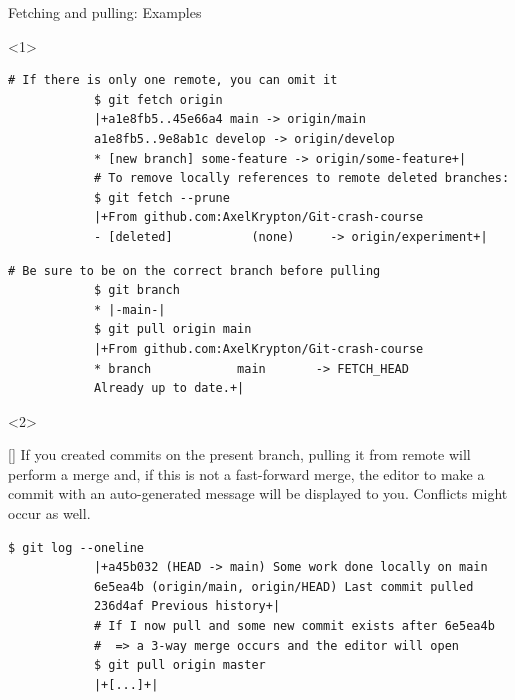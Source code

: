 \documentclass[usenames,svgnames,14pt]{beamer}
\begin{document}
\begin{frame}[fragile]{Fetching and pulling: Examples}
    \begin{onlyenv}<1>
        \begin{lstlisting}[style=MyBash]
            # If there is only one remote, you can omit it
            $ git fetch origin
            |+a1e8fb5..45e66a4 main -> origin/main
            a1e8fb5..9e8ab1c develop -> origin/develop
            * [new branch] some-feature -> origin/some-feature+|
            # To remove locally references to remote deleted branches:
            $ git fetch --prune
            |+From github.com:AxelKrypton/Git-crash-course
            - [deleted]           (none)     -> origin/experiment+|
        \end{lstlisting}
        \begin{lstlisting}[style=MyBash]
            # Be sure to be on the correct branch before pulling
            $ git branch
            * |-main-|
            $ git pull origin main
            |+From github.com:AxelKrypton/Git-crash-course
            * branch            main       -> FETCH_HEAD
            Already up to date.+|
        \end{lstlisting}
    \end{onlyenv}
    \begin{onlyenv}<2>
        \begin{varblock}{}[\textwidth]{}
            If you created commits on the present branch, pulling it from remote will perform a merge and, if this is not a fast-forward merge, the editor to make a commit with an auto-generated message will be displayed to you. \alert{Conflicts might occur as well.}
        \end{varblock}
        \begin{lstlisting}[style=MyBash]
            $ git log --oneline
            |+a45b032 (HEAD -> main) Some work done locally on main
            6e5ea4b (origin/main, origin/HEAD) Last commit pulled
            236d4af Previous history+|
            # If I now pull and some new commit exists after 6e5ea4b
            #  => a 3-way merge occurs and the editor will open
            $ git pull origin master
            |+[...]+|
        \end{lstlisting}
    \end{onlyenv}
\end{frame}
\end{document}
